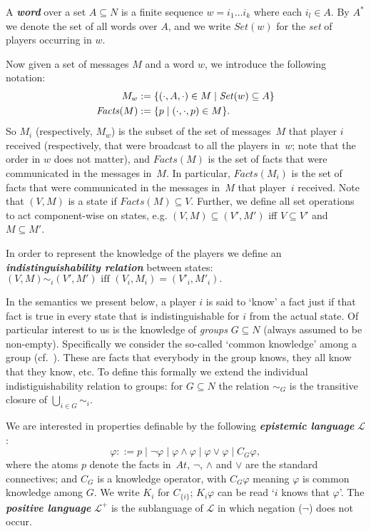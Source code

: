 \documentclass{article}
\let\cite\citep
\newcounter{#1}
\newcommand{\state}[1][]{\ensuremath{(V#1,M#1)}\xspace}
\newcommand{\dfn}[1]{\emph{\bfseries #1}}
\newcommand{\setof}[1]{\ensuremath{\mathit{Set}(#1)}\xspace}
\newcommand{\bits}{\ensuremath{At}\xspace}
\newcommand{\knows}[1]{\ensuremath{K_{#1}}\xspace}
\newcommand{\ck}[1]{\ensuremath{C_{#1}}\xspace}\newcommand{\Facts}{\mathit{Facts}}
\begin{document}
A \dfn{word} over a set $A\subseteq N$ is a finite sequence $w=i_1\ldots i_k$ where each $i_l \in A$.
By $A^*$ we denote the set of all words over $A$,
and we write $\setof w$ for the \emph{set} of players occurring in $w$.

Now given a set of messages $M$ and a word $w$, we introduce the following notation: 
\begin{align*}
M_w &:= \C{(\cdot,A,\cdot) \in M \mid \setof w\subseteq A}\\
\Facts(M) &:= \C{p \mid (\cdot, \cdot,p) \in M}.
\end{align*}
So $M_i$ (respectively, $M_w$) is the subset of the set of messages~$M$ that player $i$ received
(respectively, that were broadcast to all the players in~$w$; note that the order in $w$ does not matter),
and $\Facts(M)$ is the set of facts that were communicated in the messages in~$M$.
In particular, $\Facts(M_i)$ is the set of facts that were communicated
in the messages in~$M$ that player~$i$ received.
Note that \state is a state if $\Facts(M)\subseteq V$.
Further, we define all set operations to act component-wise on states, e.g.
$\state \subseteq \state[']$ iff $V \subseteq V'$ and $M \subseteq M'$.

In order to represent the knowledge of the players we define
an \dfn{indistinguishability relation} between states:
$ \mbox{$\state  \sim_i \state[']$ iff $(V_i, M_i) = (V'_i, M'_i)$.}
$ 

In the semantics we present below, a player $i$ is said to `know' a fact
just if that fact is true in every state that is indistinguishable for $i$
from the actual state.  Of particular interest to us is the knowledge of
\emph{groups} $G\subseteq N$ (always assumed to be non-empty).
Specifically we consider the so-called
`common knowledge' among a group (cf.~\cite[p.~23]{FHMV_RAK}).
These are facts that everybody in the group knows,
they all know that they know, etc.
To define this formally we extend the individual
indistiguishability relation to groups:
for $G \subseteq N$ the relation $\sim_G$ is the transitive
closure of $\bigcup_{i \in G}\sim_i$.


We are interested in properties definable by the following  \dfn{epistemic language} $\mathcal{L}$:
\[
 \varphi ::= p \mid \neg \varphi \mid \varphi \land \varphi \mid \varphi \lor \varphi \mid \ck G \varphi,
\]
where the atoms $p$ denote the facts in~$\bits$,
$\neg$, $\land$ and $\lor$ are the standard connectives;
and $\ck G$ is a knowledge operator, with $\ck G \varphi$ meaning $\varphi$
is common knowledge among $G$.
We write $\knows i$ for $\ck{\{i\}}$;
$\knows i \varphi$ can be read `$i$ knows that $\varphi$'.
The \dfn{positive language} $\mathcal{L}^+$ is the sublanguage of $\mathcal{L}$
in which negation ($\neg$) does not occur.
\end{document}
